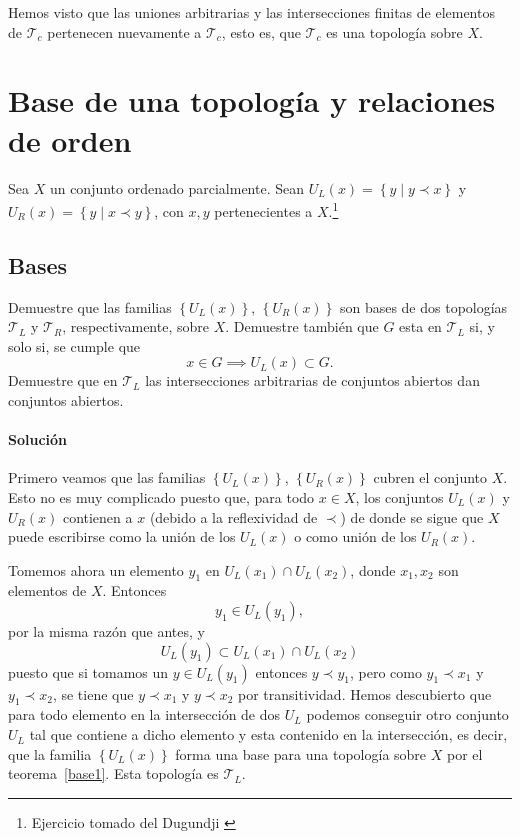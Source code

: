 \documentclass[letterpaper,10pt,final]{article}
\newcommand{\Tc}{\mathcal{T}_c}
\begin{document}
Hemos visto que las uniones arbitrarias y las
intersecciones finitas de elementos de $\Tc$
pertenecen nuevamente a $\Tc$, esto es, que
$\Tc$ es una topología sobre $X$.

\section{Base de una topología y relaciones de orden}\label{sec:bas}

Sea $X$ un conjunto ordenado parcialmente. Sean $U_L(x)=\left\{ y\mid y\prec x \right\}$ y
$U_R(x)=\left\{ y\mid x\prec y \right\}$, con $x,y$ pertenecientes a $X$.\footnote{Ejercicio tomado del Dugundji \cite[Cap. 3, \S3, Nº 6]{dugundji_topology_1987}}

\subsection{Bases}\label{sec:bases}
Demuestre que las familias $\left\{ U_L(x) \right\}$, $\left\{ U_R(x) \right\}$ son bases de dos topologías
$\mathcal{T}_L$ y $\mathcal{T}_R$, respectivamente, sobre $X$.
Demuestre también que $G$ esta en $\mathcal{T}_L$ si, y solo si, se cumple que 
\[
x\in G\implies U_L(x)\subset G.
\]
Demuestre que en $\mathcal{T}_L$ las intersecciones arbitrarias de conjuntos abiertos dan conjuntos abiertos.

\paragraph{Solución}
Primero veamos que las familias $\left\{ U_L(x) \right\}$, $\left\{ U_R(x) \right\}$
cubren el conjunto $X$. Esto no es muy complicado puesto que, para todo $x\in X$,
los conjuntos $ U_L(x) $ y $ U_R(x) $ contienen a $x$ 
(debido a la reflexividad de $\prec$) de donde se sigue que $X$ puede escribirse
como la unión de los $U_L(x)$ o como unión de los $U_R(x)$.

Tomemos ahora un elemento $y_1$ en $U_L(x_1)\cap U_L(x_2)$, donde
$x_1,x_2$ son elementos de $X$. Entonces
\[
y_1\in U_L(y_1),
\]
por la misma razón que antes, y
\[
U_L(y_1)\subset U_L(x_1)\cap U_L(x_2)
\]
puesto que si tomamos un $y\in U_L(y_1)$ entonces $y\prec y_1$, pero como
$y_1\prec x_1$ y $y_1\prec x_2$, se tiene que $y\prec x_1$ y $y\prec x_2$ por
transitividad. Hemos descubierto que para todo elemento en la intersección de dos $U_L$
podemos conseguir otro conjunto $U_L$ tal que contiene a dicho elemento y esta contenido en la
intersección, es decir, que la familia $\left\{ U_L(x) \right\}$ forma una base para una topología
sobre $X$ por el teorema~\ref{base1}. Esta topología es $\mathcal{T}_L$.
\end{document}
